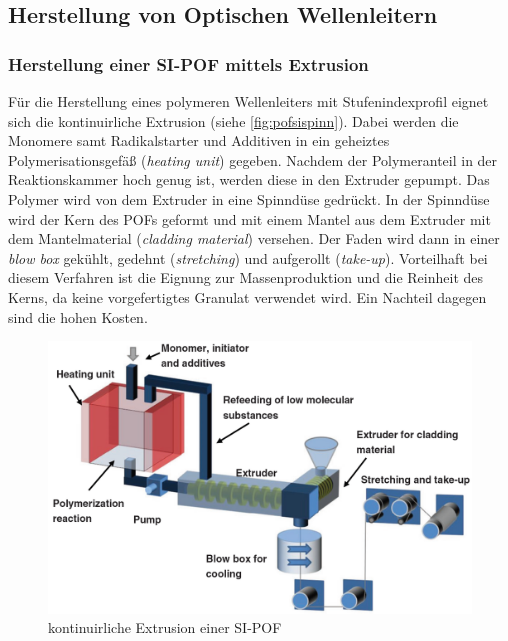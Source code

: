 \subsection{Herstellung von Optischen Wellenleitern}
\label{subsec:pofherstellungsverfahren}

\subsubsection{Herstellung einer SI-POF mittels Extrusion}

Für die Herstellung eines polymeren Wellenleiters mit Stufenindexprofil eignet
sich die kontinuirliche Extrusion (siehe \autoref{fig:pofsispinn}). Dabei werden
die Monomere samt Radikalstarter und Additiven in ein geheiztes
Polymerisationsgefäß (\textit{heating unit}) gegeben. Nachdem der Polymeranteil
in der Reaktionskammer hoch genug ist, werden diese in den Extruder gepumpt. Das
Polymer wird von dem Extruder in eine Spinndüse gedrückt. In der Spinndüse wird
der Kern des POFs geformt und mit einem Mantel aus dem Extruder mit dem
Mantelmaterial (\textit{cladding material}) versehen. Der Faden wird dann in
einer \textit{blow box} gekühlt, gedehnt (\textit{stretching}) und aufgerollt
(\textit{take-up}). Vorteilhaft bei diesem Verfahren ist die Eignung zur
Massenproduktion und die Reinheit des Kerns, da keine vorgefertigtes Granulat
verwendet wird. Ein Nachteil dagegen sind die hohen Kosten.

\begin{figure}[h]
    \begin{center}
        \begin{minipage}[t]{\textwidth}
            \begin{center}
                \includegraphics[height=0.25\textheight]{Bilder/Optische_Wellenleiter_Die_Polymer_Optische_Faser/Herstellung/pofsispinn.png}
                \caption[kontinuirliche Extrusion einer SI-POF \newline \url{http://www.researchgate.net/publication/265646639_An_overview_on_fabrication_methods_for_polymer_optical_fibers} S. 5 (zuletzt aufgerufen am 28.09.2015)]{kontinuirliche Extrusion einer SI-POF}
                \label{fig:pofsispinn}
            \end{center}
        \end{minipage}
    \end{center}
\end{figure}

